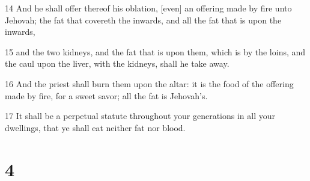 \par 14 And he shall offer thereof his oblation, [even] an offering made by fire unto Jehovah; the fat that covereth the inwards, and all the fat that is upon the inwards,
\par 15 and the two kidneys, and the fat that is upon them, which is by the loins, and the caul upon the liver, with the kidneys, shall he take away.
\par 16 And the priest shall burn them upon the altar: it is the food of the offering made by fire, for a sweet savor; all the fat is Jehovah's.
\par 17 It shall be a perpetual statute throughout your generations in all your dwellings, that ye shall eat neither fat nor blood.

\chapter{4}

